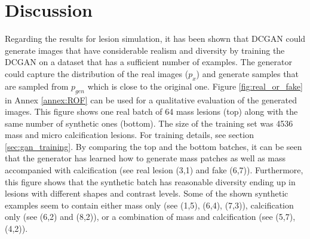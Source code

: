 \documentclass[final,3p,twocolumn,authoryear,sort&compress,times]{maia}
\begin{document}
\section{Discussion}
\label{sec:discussion}
Regarding the results for lesion simulation, it has been shown that DCGAN could generate images that have considerable realism and diversity by training the DCGAN on a dataset that has a sufficient number of examples. The generator could capture the distribution of the real images ($p_{x}$) and generate samples that are sampled from $p_{gen}$ which is close to the original one.
Figure \ref{fig:real_or_fake} in Annex \ref{annex:ROF} can be used for a qualitative evaluation of the generated images. This figure shows one real batch of 64 mass lesions (top) along with the same number of synthetic ones (bottom). The size of the training set was 4536 mass and micro calcification lesions. For training details, see section \ref{sec:gan_training}. By comparing the top and the bottom batches, it can be seen that the generator has learned how to generate mass patches as well as mass accompanied with calcification (see real lesion (3,1) and fake (6,7)). Furthermore, this figure shows that the synthetic batch has reasonable diversity ending up in lesions with different shapes and contrast levels. Some of the shown synthetic examples seem to contain either mass only (see (1,5), (6,4), (7,3)), calcification only (see (6,2) and (8,2)), or a combination of mass and calcification (see (5,7), (4,2)).
\end{document}
